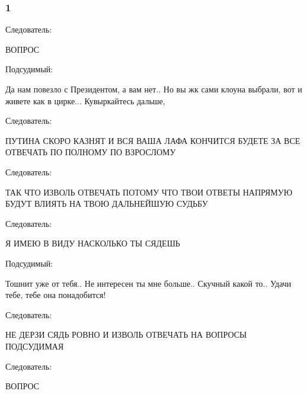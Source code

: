 
 
 
 
 

\subsubsection{1}

Следователь:

ВОПРОС

Подсудимый:

Да нам повезло с Президентом, а вам нет.. Но вы жк сами клоуна выбрали, вот и
живете как в цирке... Кувыркайтесь дальше,

Следователь:

ПУТИНА СКОРО КАЗНЯТ И ВСЯ ВАША ЛАФА КОНЧИТСЯ БУДЕТЕ ЗА ВСЕ ОТВЕЧАТЬ ПО ПОЛНОМУ
ПО ВЗРОСЛОМУ

Следователь:

ТАК ЧТО ИЗВОЛЬ ОТВЕЧАТЬ ПОТОМУ ЧТО ТВОИ ОТВЕТЫ НАПРЯМУЮ БУДУТ ВЛИЯТЬ НА ТВОЮ
ДАЛЬНЕЙШУЮ СУДЬБУ

Следователь:

Я ИМЕЮ В ВИДУ НАСКОЛЬКО ТЫ СЯДЕШЬ

Подсудимый:

Тошнит уже от тебя.. Не интересен ты мне больше.. Скучный какой то.. Удачи
тебе, тебе она понадобится!

Следователь:

НЕ ДЕРЗИ СЯДЬ РОВНО И ИЗВОЛЬ ОТВЕЧАТЬ НА ВОПРОСЫ ПОДСУДИМАЯ

Следователь:

ВОПРОС

